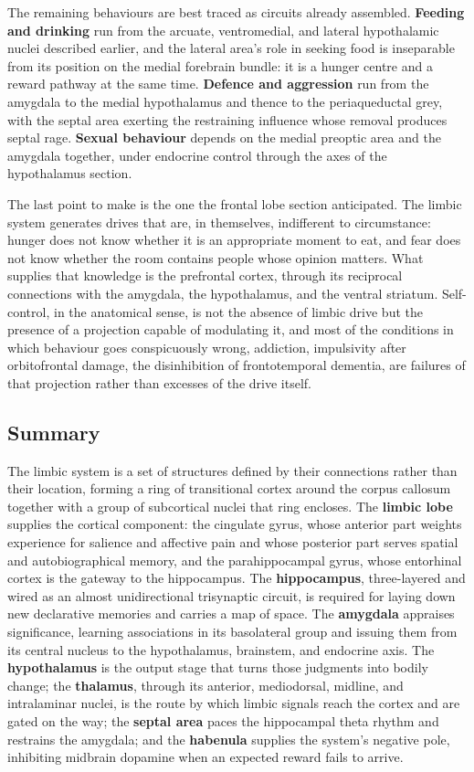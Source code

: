 \documentclass[11pt]{article}
\begin{document}
The remaining behaviours are best traced as circuits already assembled. \textbf{Feeding and drinking} run from the arcuate, ventromedial, and lateral hypothalamic nuclei described earlier, and the lateral area's role in seeking food is inseparable from its position on the medial forebrain bundle: it is a hunger centre and a reward pathway at the same time. \textbf{Defence and aggression} run from the amygdala to the medial hypothalamus and thence to the periaqueductal grey, with the septal area exerting the restraining influence whose removal produces septal rage. \textbf{Sexual behaviour} depends on the medial preoptic area and the amygdala together, under endocrine control through the axes of the hypothalamus section.

The last point to make is the one the frontal lobe section anticipated. The limbic system generates drives that are, in themselves, indifferent to circumstance: hunger does not know whether it is an appropriate moment to eat, and fear does not know whether the room contains people whose opinion matters. What supplies that knowledge is the prefrontal cortex, through its reciprocal connections with the amygdala, the hypothalamus, and the ventral striatum. Self-control, in the anatomical sense, is not the absence of limbic drive but the presence of a projection capable of modulating it, and most of the conditions in which behaviour goes conspicuously wrong, addiction, impulsivity after orbitofrontal damage, the disinhibition of frontotemporal dementia, are failures of that projection rather than excesses of the drive itself.

\subsection{Summary}

The limbic system is a set of structures defined by their connections rather than their location, forming a ring of transitional cortex around the corpus callosum together with a group of subcortical nuclei that ring encloses. The \textbf{limbic lobe} supplies the cortical component: the cingulate gyrus, whose anterior part weights experience for salience and affective pain and whose posterior part serves spatial and autobiographical memory, and the parahippocampal gyrus, whose entorhinal cortex is the gateway to the hippocampus. The \textbf{hippocampus}, three-layered and wired as an almost unidirectional trisynaptic circuit, is required for laying down new declarative memories and carries a map of space. The \textbf{amygdala} appraises significance, learning associations in its basolateral group and issuing them from its central nucleus to the hypothalamus, brainstem, and endocrine axis. The \textbf{hypothalamus} is the output stage that turns those judgments into bodily change; the \textbf{thalamus}, through its anterior, mediodorsal, midline, and intralaminar nuclei, is the route by which limbic signals reach the cortex and are gated on the way; the \textbf{septal area} paces the hippocampal theta rhythm and restrains the amygdala; and the \textbf{habenula} supplies the system's negative pole, inhibiting midbrain dopamine when an expected reward fails to arrive.
\end{document}

